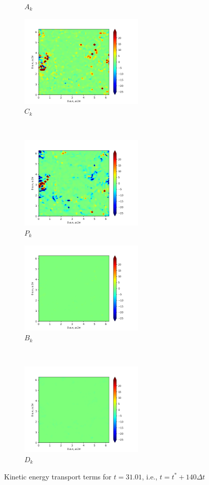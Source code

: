 \begin{figure}[H]
\begin{subfigure}{0.45\textwidth}
        \caption{$A_{k}$}
    \end{subfigure}
    \newline
    \begin{subfigure}{0.45\textwidth}
        \includegraphics[height=1.75in]{media/run-cds-65/C-ke-1480.png}
        \caption{$C_{k}$}
    \end{subfigure}
    ~
    \begin{subfigure}{0.45\textwidth}
        \includegraphics[height=1.75in]{media/run-cds-65/P-ke-1480.png}
        \caption{$P_{k}$}
    \end{subfigure}
    \newline
    \begin{subfigure}{0.45\textwidth}
        \includegraphics[height=1.75in]{media/run-cds-65/B-ke-1480.png}
        \caption{$B_{k}$}
    \end{subfigure}
    ~
    \begin{subfigure}{0.45\textwidth}
        \includegraphics[height=1.75in]{media/run-cds-65/D-ke-1480.png}
        \caption{$D_{k}$}
    \end{subfigure}
    \caption{Kinetic energy transport terms for $t=31.01$, i.e., $t=t^{\ast} + 140 \Delta t$}
\end{figure}
